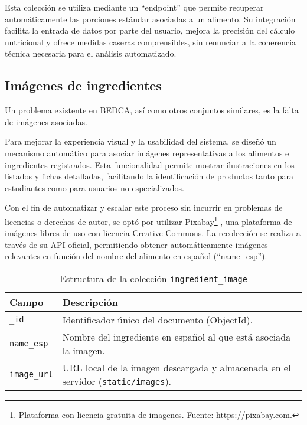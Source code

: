 Esta colección se utiliza mediante un ``endpoint'' que permite recuperar automáticamente las porciones estándar asociadas a un alimento. Su integración facilita la entrada de datos por parte del usuario, mejora la precisión del cálculo nutricional y ofrece medidas caseras comprensibles, sin renunciar a la coherencia técnica necesaria para el análisis automatizado.

\subsection{Imágenes de ingredientes}

Un problema existente en BEDCA, así como otros conjuntos similares, es la falta de imágenes asociadas. 

Para mejorar la experiencia visual y la usabilidad del sistema, se diseñó un mecanismo automático para asociar imágenes representativas a los alimentos e ingredientes registrados. Esta funcionalidad permite mostrar ilustraciones en los listados y fichas detalladas, facilitando la identificación de productos tanto para estudiantes como para usuarios no especializados.

Con el fin de automatizar y escalar este proceso sin incurrir en problemas de licencias o derechos de autor, se optó por utilizar Pixabay\footnote{Plataforma con licencia gratuita de imagenes. Fuente: \url{https://pixabay.com}.}
, una plataforma de imágenes libres de uso con licencia Creative Commons. La recolección se realiza a través de su API oficial, permitiendo obtener automáticamente imágenes relevantes en función del nombre del alimento en español (``name\_esp'').

\begin{table}[H]
    \centering
    \begin{tabular}{|l|p{8cm}|}
        \hline
        \textbf{Campo} & \textbf{Descripción} \\
        \hline
        \texttt{\_id} & Identificador único del documento (ObjectId). \\
        \hline
        \texttt{name\_esp} & Nombre del ingrediente en español al que está asociada la imagen. \\
        \hline
        \texttt{image\_url} & URL local de la imagen descargada y almacenada en el servidor (\texttt{static/images}). \\
        \hline
    \end{tabular}
    \caption{Estructura de la colección \texttt{ingredient\_image}}
    \label{tab:ingredient_image}
\end{table}

